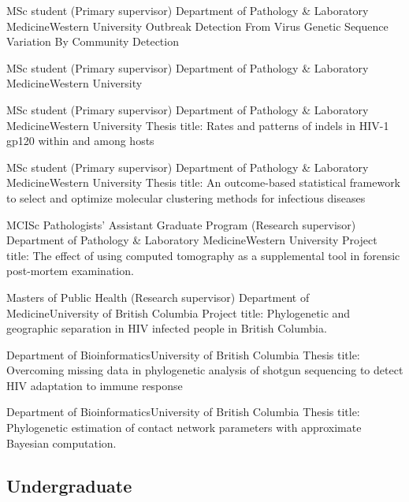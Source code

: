 {MSc student (Primary supervisor)}
{Department of Pathology \& Laboratory Medicine}{Western University}
{Outbreak Detection From Virus Genetic Sequence Variation By Community Detection}

{MSc student (Primary supervisor)}
{Department of Pathology \& Laboratory Medicine}{Western University}
{}

{MSc student (Primary supervisor)}
{Department of Pathology \& Laboratory Medicine}{Western University}
{Thesis title: Rates and patterns of indels in HIV-1 gp120 within and among hosts}

{MSc student (Primary supervisor)}
{Department of Pathology \& Laboratory Medicine}{Western University}
{Thesis title: An outcome-based statistical framework to select and optimize molecular clustering methods for infectious diseases}

{MCISc Pathologists' Assistant Graduate Program (Research supervisor)}
{Department of Pathology \& Laboratory Medicine}{Western University}
{Project title: The effect of using computed tomography as a supplemental tool in forensic post-mortem examination.}

{Masters of Public Health (Research supervisor)}
{Department of Medicine}{University of British Columbia}
{Project title: Phylogenetic and geographic separation in HIV infected people in British Columbia.}

{Department of Bioinformatics}{University of British Columbia}
{Thesis title: Overcoming missing data in phylogenetic analysis of shotgun sequencing to detect HIV adaptation to immune response}

{Department of Bioinformatics}{University of British Columbia}
{Thesis title: Phylogenetic estimation of contact network parameters with approximate Bayesian computation.}


\subsection {Undergraduate}


